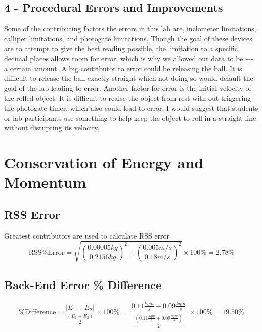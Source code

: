 \documentclass{report}
\begin{document}
\section*{4 - Procedural Errors and Improvements}

Some of the contributing factors the errors in this lab are, inclometer limitations, calliper limitations,
and photogate limitations. Though the goal of these devices are to attempt to give the best reading possible,
the limitation to a specific decimal places allows room for error, which is why we allowed our data to be +-
a certain amount. A big contributor to error could be releasing the ball. It is difficult to release the ball exactly 
straight which not doing so would default the goal of the lab leading to error. Another factor for error is the 
initial velocity of the rolled object. It is difficult to realse the object from rest with out triggering 
the photogate timer, which also could lead to error. I would suggest that students or lab participants use something
to help keep the object to roll in a straight line without disrupting its velocity.

\chapter{Conservation of Energy and Momentum}
\section*{RSS Error}

\begin{center}
  \noindent Greatest contributors are used to calculate RSS error
  \begin{equation*}
      \text{RSS\% Error} = \sqrt{ \left( \frac{0.00005kg}{0.2156kg} \right)^2 
      + \left( \frac{0.005 m/s}{0.18m/s} \right)^2}
      \times 100\% = 2.78\%
  \end{equation*}
\end{center}

\section*{Back-End Error \% Difference}

\begin{center}
  \begin{equation*}
    \text{\% Difference} = \frac{|E_1 - E_2|}{\frac{(E_1 + E_2)}{2}} \times 100\% 
    = \frac{|0.11 \frac{kgm}{s} - 0.09 \frac{kgm}{s}|}{\frac{(0.11 \frac{kgm}{s}+ 0.09 \frac{kgm}{s})}{2}} \times 100\% = 19.50\%
  \end{equation*}
\end{center}
\end{document}
